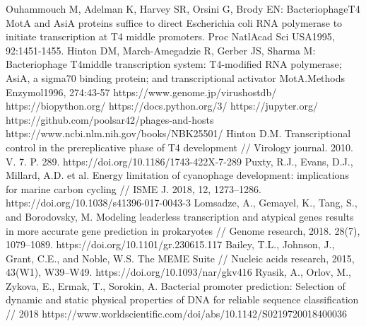 \documentclass[a4paper,12pt]{article}
\begin{document}
\begin{thebibliography}{9}
     Ouhammouch M, Adelman K, Harvey SR, Orsini G, Brody EN: BacteriophageT4 MotA and AsiA proteins suffice to direct Escherichia coli RNA polymerase to initiate transcription at T4 middle promoters. Proc  NatlAcad  Sci  USA1995, 92:1451-1455.
     Hinton DM, March-Amegadzie R, Gerber JS, Sharma M: Bacteriophage T4middle transcription system: T4-modified RNA polymerase; AsiA, a sigma70 binding protein; and transcriptional activator MotA.Methods  Enzymol1996, 274:43-57
     https://www.genome.jp/virushostdb/ 
     https://biopython.org/
     https://docs.python.org/3/
     https://jupyter.org/
     https://github.com/poolsar42/phages-and-hosts
     https://www.ncbi.nlm.nih.gov/books/NBK25501/
     Hinton D.M. Transcriptional control in the prereplicative phase of T4 development // Virology
    journal. 2010. V. 7. P. 289. https://doi.org/10.1186/1743-422X-7-289
     Puxty, R.J., Evans, D.J., Millard, A.D. et al. Energy limitation of cyanophage development:
    implications for marine carbon cycling // ISME J. 2018, 12, 1273–1286. https://doi.org/10.1038/s41396-017-0043-3
     Lomsadze, A., Gemayel, K., Tang, S., and Borodovsky, M. Modeling leaderless transcription and
    atypical genes results in more accurate gene prediction in prokaryotes // Genome research,  2018. 28(7), 1079–1089.
    https://doi.org/10.1101/gr.230615.117
     Bailey, T.L., Johnson, J., Grant, C.E., and Noble, W.S. The MEME Suite // Nucleic acids research,
    2015, 43(W1), W39–W49. https://doi.org/10.1093/nar/gkv416
     Ryasik, A., Orlov, M., Zykova, E., Ermak, T., Sorokin, A. Bacterial promoter prediction: Selection
    of dynamic and static physical properties of DNA for reliable sequence classification // 2018
    https://www.worldscientific.com/doi/abs/10.1142/S0219720018400036
    
\end{thebibliography}
\end{document}
